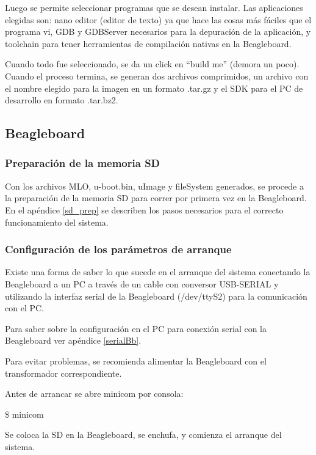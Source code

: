 \bigskip
Luego se permite seleccionar programas que se desean instalar.
Las aplicaciones elegidas son: nano editor (editor de texto) ya que hace las cosas más fáciles que el programa vi, GDB y GDBServer necesarios para la depuración de la aplicación, y toolchain para tener herramientas de compilación nativas en la Beagleboard.

\bigskip
Cuando todo fue seleccionado, se da un click en “build me” (demora un poco).
Cuando el proceso termina, se generan dos archivos comprimidos, un archivo con el nombre elegido para la imagen en un formato .tar.gz y el SDK para el PC de desarrollo en formato .tar.bz2. 

\subsection{Beagleboard}

\subsubsection{Preparación de la memoria SD}

Con los archivos MLO, u-boot.bin, uImage y fileSystem generados, se procede a la preparación de la memoria SD para correr por primera vez en la Beagleboard. En el apéndice \ref{sd_prep} se describen los pasos necesarios para el correcto funcionamiento del sistema.


\subsubsection{Configuración de los parámetros de arranque}

Existe una forma de saber lo que sucede en el arranque del sistema conectando la Beagleboard a un PC a través de un cable con conversor USB-SERIAL y utilizando la interfaz serial de la Beagleboard (/dev/ttyS2) para la comunicación con el PC.

\bigskip
Para saber sobre la configuración en el PC para conexión serial con la Beagleboard ver apéndice \ref{serialBb}.


\bigskip
Para evitar problemas, se recomienda alimentar la Beagleboard con el transformador correspondiente.

\bigskip
Antes de arrancar se abre minicom por consola: 

\bigskip
\centerline{\$ minicom}

\bigskip
Se coloca la SD en la Beagleboard, se enchufa, y comienza el arranque del sistema. 

